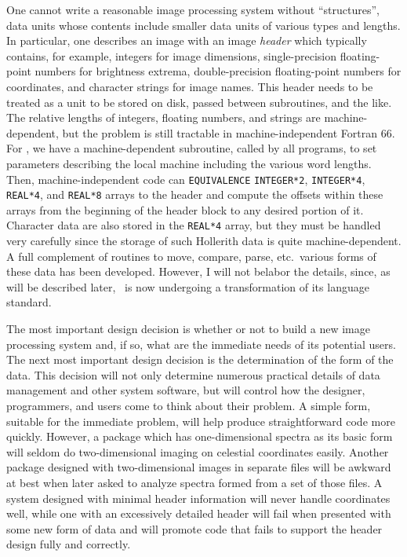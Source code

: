      One cannot write a reasonable image processing system without
``structures'', data units whose contents include smaller data units
of various types and lengths.  In particular, one describes an image
with an image {\it header} which typically contains, for example, integers
for image dimensions, single-precision floating-point numbers
for brightness extrema, double-precision floating-point numbers
for coordinates, and character strings for image names.  This
header needs to be treated as a unit to be stored on disk, passed
between subroutines, and the like.  The relative lengths of integers,
floating numbers, and strings are machine-dependent, but the problem
is still tractable in machine-independent Fortran 66.  For \AIPS,
we have a machine-dependent subroutine, called by all programs, to
set parameters describing the local machine including the various
word lengths.  Then, machine-independent code can {\tt EQUIVALENCE}
{\tt INTEGER*2}, {\tt INTEGER*4}, {\tt REAL*4}, and {\tt REAL*8} arrays
to the header and compute the offsets within these arrays from the
beginning of the header block to any desired portion of it.  Character
data are also stored in the {\tt REAL*4} array, but they must be
handled very carefully since the storage of such Hollerith data is
quite machine-dependent.  A full complement of routines to move,
compare, parse, etc.~various forms of these data has been developed.
However, I will not belabor the details, since, as will be described
later, \AIPS\ is now undergoing a transformation of its language standard.


     The most important design decision is whether or not to build
a new image processing system and, if so, what are the immediate
needs of its potential users.  The next most important design decision
is the determination of the form of the data.  This decision will not only
determine numerous practical details of data management and other
system software, but will control how the designer, programmers, and
users come to think about their problem.  A simple form, suitable for
the immediate problem, will help produce straightforward code more quickly.
However, a package which has one-dimensional spectra as its basic
form will seldom do two-dimensional imaging on celestial coordinates
easily.  Another package designed with two-dimensional
images in separate files will be awkward at best when later asked to
analyze spectra formed from a set of those files.  A system designed
with minimal header information will never handle coordinates well,
while one with an excessively detailed header will fail when presented
with some new form of data and will promote code that fails to
support the header design fully and correctly.

